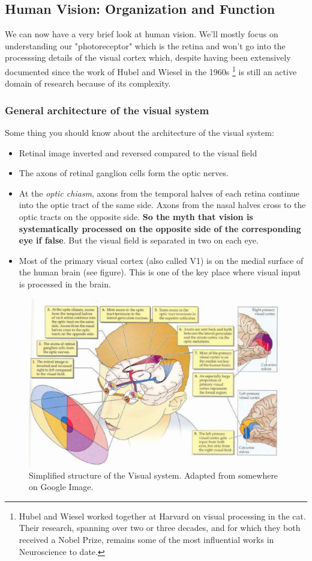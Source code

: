 \subsection{Human Vision: Organization and Function}

We can now have a very brief look at human vision. We'll mostly focus on understanding our "photoreceptor" which is the retina and won't go into the processsing details of the visual cortex which, despite having been extensively documented since the work of Hubel and Wiesel in the 1960s \footnote{Hubel and Wiesel worked together at Harvard on visual processing in the cat. Their research, spanning over two or three decades, and for which they both received a Nobel Prize, remains some of the most influential works in Neuroscience to date.} is still an active domain of research because of its complexity. 

\subsubsection{General architecture of the visual system}

Some thing you should know about the architecture of the visual system: 
\begin{itemize}
    \item Retinal image inverted and reversed compared to the visual field
    \item The axons of retinal ganglion cells form the optic nerves.
    \item At the \textit{optic chiasm}, axons from the temporal halves of each retina continue into the optic tract of the same side. Axons from the nasal halves cross to the optic tracts on the opposite side. \textbf{So the myth that vision is systematically processed on the opposite side of the corresponding eye if false}. But the visual field is separated in two on each eye.  
    \item Most of the primary visual cortex (also called V1) is on the medial surface of the human brain (see figure). This is one of the key place where visual input is processed in the brain.
\end{itemize}

\begin{figure}[H]
    \centering
    \includegraphics[width=0.9\linewidth]{../../Figures/Vision.PNG}
    \caption{Simplified structure of the Visual system. Adapted from somewhere on Google Image.}
    \label{Vision}
\end{figure}

